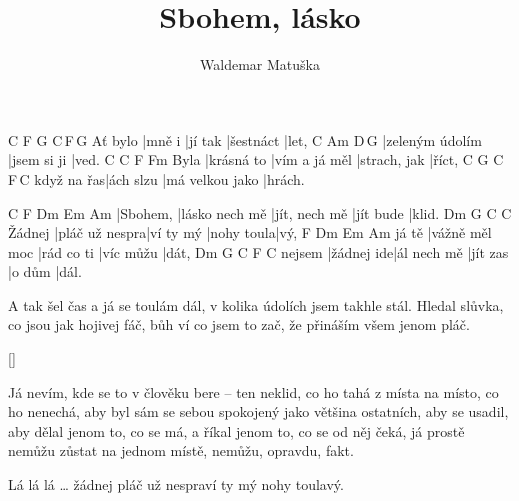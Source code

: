 \documentclass{song}
\title{Sbohem, lásko}
\author{Waldemar Matuška}
\begin{document}
\strophe
        C      F       G         C\,F\,G
Ať bylo |mně i |jí tak |šestnáct |let,
C               Am          D\7\,G\7
|zeleným údolím |jsem si ji |ved.
     C          C\7           F            Fm
Byla |krásná to |vím a já měl |strach, jak |říct,
           C         G\7             C\,F\,C
když na řas|ách slzu |má velkou jako |hrách.
\endstrophe

C\7      F              Dm            Em        Am
|Sbohem, |lásko nech mě |jít, nech mě |jít bude |klid.
       Dm             G\7       C          C\7
Žádnej |pláč už nespra|ví ty mý |nohy toula|vý,
      F              Dm         Em        Am
já tě |vážně měl moc |rád co ti |víc můžu |dát,
       Dm         G\7         C        F      C
nejsem |žádnej ide|ál nech mě |jít zas |o dům |dál.
\endstrophe

\strophe*
A tak šel čas a já se toulám dál,
v kolika údolích jsem takhle stál.
Hledal slůvka, co jsou jak hojivej fáč,
bůh ví co jsem to zač, že přináším všem jenom pláč.
\endstrophe

\ref{}

\begin{recitative}
Já nevím, kde se to v člověku bere -- ten neklid,
co ho tahá z místa na místo, co ho nenechá,
aby byl sám se sebou spokojený jako většina ostatních,
aby se usadil, aby dělal jenom to, co se má,
a říkal jenom to, co se od něj čeká,
já prostě nemůžu zůstat na jednom místě, nemůžu, opravdu, fakt.
\end{recitative}

Lá lá lá \ldots
žádnej pláč už nespraví ty mý nohy toulavý.
\endstrophe
\end{document}

